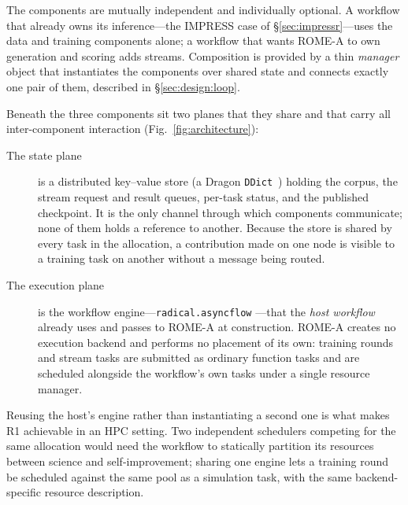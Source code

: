 The components are mutually independent and individually optional. A workflow
that already owns its inference---the IMPRESS case of \S\ref{sec:impressr}---uses
the data and training components alone; a workflow that wants ROME-A to own
generation and scoring adds streams. Composition is provided by a thin
\emph{manager} object that instantiates the components over shared state and
connects exactly one pair of them, described in \S\ref{sec:design:loop}.

Beneath the three components sit two planes that they share and that carry all
inter-component interaction (Fig.~\ref{fig:architecture}):

\begin{description}
  \item[The state plane] is a distributed key--value store (a Dragon
    \texttt{DDict}~\cite{dragon}) holding the corpus, the stream request and
    result queues, per-task status, and the published checkpoint. It is the only
    channel through which components communicate; none of them holds a reference
    to another. Because the store is shared by every task in the allocation, a
    contribution made on one node is visible to a training task on another
    without a message being routed.
  \item[The execution plane] is the workflow engine---\texttt{radical.asyncflow}
    \cite{asyncflow}---that the \emph{host workflow} already uses and passes to
    ROME-A at construction. ROME-A creates no execution backend and performs no
    placement of its own: training rounds and stream tasks are submitted as
    ordinary function tasks and are scheduled alongside the workflow's own tasks
    under a single resource manager.
\end{description}

Reusing the host's engine rather than instantiating a second one is what makes
R1 achievable in an HPC setting. Two independent schedulers competing for the
same allocation would need the workflow to statically partition its resources
between science and self-improvement; sharing one engine lets a training round
be scheduled against the same pool as a simulation task, with the same
backend-specific resource description.

